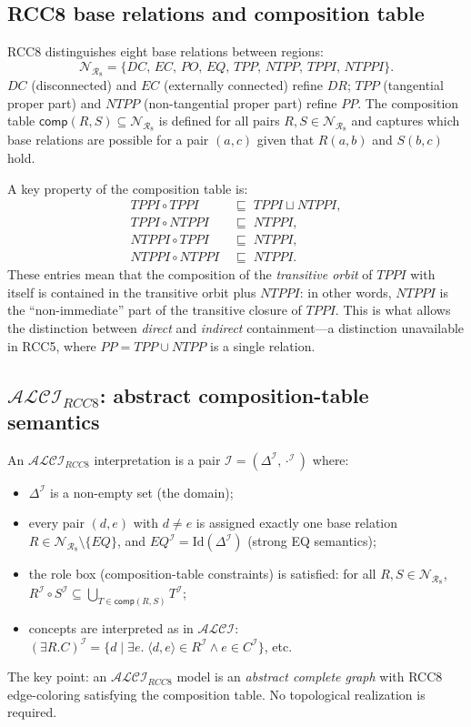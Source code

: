 \documentclass[11pt]{article}
\newcommand{\ALCIRCC}[1]{\ensuremath{\mathcal{ALCI}_{\mathit{RCC#1}}}}
\newcommand{\ALCI}{\ensuremath{\mathcal{ALCI}}}
\newcommand{\NRe}{\ensuremath{\mathcal{N}_{\mathcal{R}_8}}}%
\newcommand{\comp}{\mathsf{comp}}
\begin{document}
\subsection{RCC8 base relations and composition table}

RCC8 distinguishes eight base relations between regions:
\[
\NRe = \{DC,\, EC,\, PO,\, EQ,\, TPP,\, NTPP,\, TPPI,\, NTPPI\}.
\]
$DC$ (disconnected) and $EC$ (externally connected) refine $DR$; $TPP$
(tangential proper part) and $NTPP$ (non-tangential proper part) refine $PP$.
The composition table $\comp(R,S) \subseteq \NRe$ is defined for all pairs
$R,S \in \NRe$ and captures which base relations are possible for a pair
$(a,c)$ given that $R(a,b)$ and $S(b,c)$ hold.

A key property of the composition table is:
\begin{align}
  TPPI \circ TPPI &\;\sqsubseteq\; TPPI \sqcup NTPPI, \label{eq:tppi-comp}\\
  TPPI \circ NTPPI &\;\sqsubseteq\; NTPPI, \label{eq:tppi-ntppi}\\
  NTPPI \circ TPPI &\;\sqsubseteq\; NTPPI, \label{eq:ntppi-tppi}\\
  NTPPI \circ NTPPI &\;\sqsubseteq\; NTPPI. \label{eq:ntppi-comp}
\end{align}
These entries mean that the composition of the \emph{transitive orbit} of $TPPI$
with itself is contained in the transitive orbit plus $NTPPI$: in other words,
$NTPPI$ is the ``non-immediate'' part of the transitive closure of $TPPI$.  This
is what allows the distinction between \emph{direct} and \emph{indirect}
containment---a distinction unavailable in RCC5, where $PP = TPP \cup NTPP$ is
a single relation.

\subsection{$\ALCIRCC{8}$: abstract composition-table semantics}

An $\ALCIRCC{8}$ interpretation is a pair $\mathcal{I} = (\Delta^{\mathcal{I}},
\cdot^{\mathcal{I}})$ where:
\begin{itemize}
  \item $\Delta^{\mathcal{I}}$ is a non-empty set (the domain);
  \item every pair $(d,e)$ with $d \neq e$ is assigned exactly one base
    relation $R \in \NRe \setminus \{EQ\}$, and $EQ^{\mathcal{I}} =
    \mathrm{Id}(\Delta^{\mathcal{I}})$
    (strong EQ semantics);
  \item the role box (composition-table constraints) is satisfied:
    for all $R,S \in \NRe$, $R^{\mathcal{I}} \circ S^{\mathcal{I}} \subseteq
    \bigcup_{T \in \comp(R,S)} T^{\mathcal{I}}$;
  \item concepts are interpreted as in $\ALCI$: $(\exists R.C)^{\mathcal{I}} =
    \{d \mid \exists e.\; \langle d,e\rangle \in R^{\mathcal{I}} \wedge e \in
    C^{\mathcal{I}}\}$, etc.
\end{itemize}
The key point: an $\ALCIRCC{8}$ model is an \emph{abstract complete graph}
with RCC8 edge-coloring satisfying the composition table.  No topological
realization is required.
\end{document}
